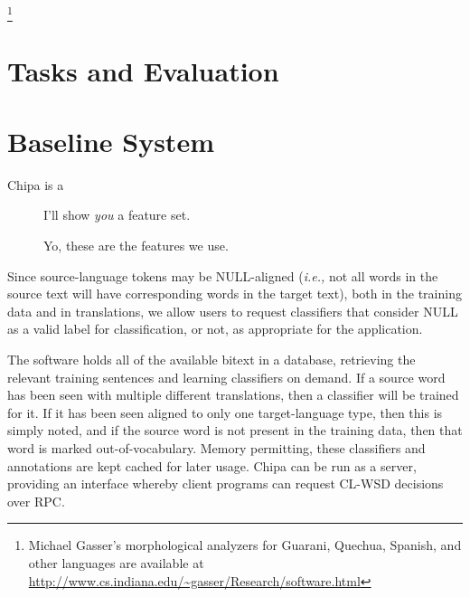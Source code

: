 \footnote{Michael Gasser's morphological analyzers for Guarani, Quechua,
Spanish, and other languages are available at
\url{http://www.cs.indiana.edu/~gasser/Research/software.html} }

\section{Tasks and Evaluation}



\section{Baseline System}
Chipa is a 

\begin{figure*}
  \begin{centering}
  I'll show \emph{you} a feature set.
  \end{centering}
  \caption{Yo, these are the features we use.}
  \label{fig:baselinefeatures}
\end{figure*}



Since source-language tokens may be NULL-aligned (\emph{i.e.,} not all words in
the source text will have corresponding words in the target text), both in the
training data and in translations, we allow users to request classifiers that
consider NULL as a valid label for classification, or not, as appropriate for
the application.

The software holds all of the available bitext in a database, retrieving the
relevant training sentences and learning classifiers on demand.
If a source word has been seen with multiple different translations, then a
classifier will be trained for it. If it has been seen aligned to only one
target-language type, then this is simply noted, and if the source word is not
present in the training data, then that word is marked out-of-vocabulary.
Memory permitting, these classifiers and annotations are kept cached for later
usage. Chipa can be run as a server, providing an interface whereby client
programs can request CL-WSD decisions over RPC.


